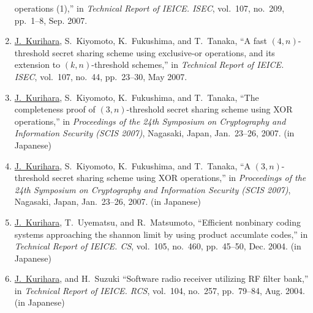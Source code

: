 \begin{enumerate}
       operations (1),'' in \textit{Technical Report of IEICE. ISEC},
       vol.~107, no.~209, pp.~1--8, Sep. 2007.
 \item \underline{J.~Kurihara}, S.~Kiyomoto, K.~Fukushima, and
       T.~Tanaka, ``A fast $(4,n)$-threshold secret sharing scheme using
       exclusive-or operations, and its extension to $(k,n)$-threshold
       schemes,'' in \textit{Technical Report of IEICE. ISEC}, vol.~107, no.~44, pp.~23--30, May
      2007.
 \item \underline{J.~Kurihara}, S.~Kiyomoto, K.~Fukushima, and
       T.~Tanaka, ``The completeness proof of $(3,n)$-threshold secret
       sharing scheme using XOR operations,'' in \textit{Proceedings of the
       24th Symposium on Cryptography and Information Security (SCIS 2007)},
       Nagasaki, Japan, Jan.~23--26, 2007. (in Japanese)
 \item \underline{J.~Kurihara}, S.~Kiyomoto, K.~Fukushima, and
       T.~Tanaka, ``A $(3,n)$-threshold secret sharing scheme using XOR
       operations,'' in \textit{Proceedings of the 24th Symposium on
       Cryptography and Information Security (SCIS 2007)}, Nagasaki,
       Japan, Jan.~23--26, 2007. (in Japanese)
 \item \underline{J.~Kurihara}, T.~Uyematsu, and R.~Matsumoto, ``Efficient nonbinary coding systems approaching the shannon limit by using product accumlate codes,'' in \textit{Technical Report of IEICE. CS}, vol.~105, no.~460, pp.~45--50, Dec. 2004. (in Japanese)
 \item \underline{J.~Kurihara}, and H.~Suzuki ``Software radio receiver utilizing RF filter bank,'' in \textit{Technical Report of IEICE. RCS}, vol.~104, no.~257, pp.~79--84, Aug. 2004. (in Japanese)
\end{enumerate}
